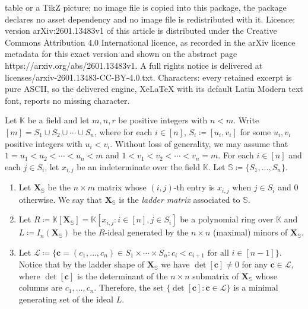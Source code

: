 \documentclass[10pt,a4paper]{amsart}
\def\KK{{\mathbb K}}
\newcommand\bdX{{\bm X}}
\newcommand\bdc{{\bm c}}
\newcommand\bfS{\mathbb{S}}
\newcommand\bfX{\mathbf{X}}
\newcommand\calL{\mathcal{L}}
\begin{document}
table or a TikZ picture; no image file is copied into this package, the package declares no asset dependency and no image file is redistributed with it. Licence: version arXiv:2601.13483v1 of this article is distributed under the Creative Commons Attribution 4.0 International licence, as recorded in the arXiv licence metadata for this exact version and shown on the abstract page https://arxiv.org/abs/2601.13483v1. A full rights notice is delivered at licenses/arxiv-2601.13483-CC-BY-4.0.txt. Characters: every retained excerpt is pure ASCII, so the delivered engine, XeLaTeX with its default Latin Modern text font, reports no missing character.
\begin{Definition}
    \label{def:Ladder} 
    Let $\KK$ be a field and let $m,n,r$ be positive integers with $n<m$.  Write $[m]=S_1 \cup S_2 \cup \cdots \cup S_n$, where for each $i\in [n]$, $S_i\coloneqq [u_i, v_i]$ for some $u_i, v_i$ positive integers with $u_i < v_i$.  Without loss of generality, we may assume that $1=u_1<  u_2 <  \cdots <  u_n < m$ and $1< v_1<  v_2 < \cdots < v_n=m$.
     For each $i\in [n]$ and each $j\in S_i$, let $x_{i,j}$ be an indeterminate over the field $\KK$. Let $\bfS \coloneq \{S_1, \ldots, S_n\}$.


    \begin{enumerate}[a]
   \item    Let  $\bfX_{\bfS}$ be the $n\times m$ matrix whose $(i,j)$-th entry is $x_{i,j}$ when $j\in S_i$ and $0$ otherwise.  We say that $\bfX_{\bfS}$ is the \emph{ladder matrix} associated to $\bfS$. 
    \item Let $R\coloneq\KK[\bfX_{\bfS}]=\KK[x_{i,j}: i\in[n], j\in S_i]$ be a polynomial ring over $\KK$ and $L\coloneq I_n(\bfX_{\bfS})$ be the $R$-ideal generated by the $n\times n$ (maximal) minors of $\bfX_{\bfS}$. 
     \item Let  $\calL\coloneqq \{\bdc=(c_1, \ldots, c_n)\in S_1\times \cdots \times S_n : c_i<c_{i+1} \mbox{ for all } i\in [n-1]\}$. Notice that by the ladder shape of $\bdX_{\bfS}$ we have  $\det[\bdc]\neq 0$ for any $\bdc\in \calL$, where  $\det[\bdc]$ is the determinant of the $n\times n$ submatrix of $\bfX_{\bfS}$ whose columns are $c_1, \ldots, c_n$.  Therefore, the set $\{ \det[\bdc] : \bdc\in \calL\}$ is a minimal generating set of the ideal $L$.
     

\end{enumerate}
\end{Definition}
\end{document}

